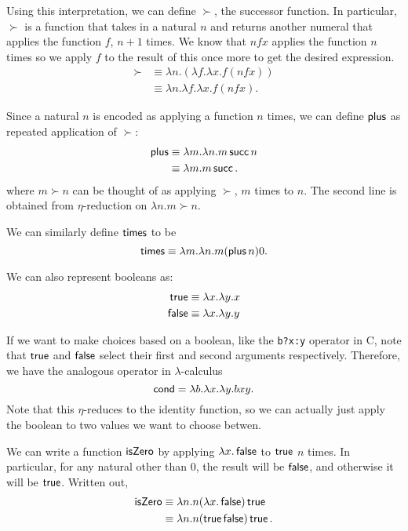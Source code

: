 \documentclass[class=scrartcl]{standalone}
\begin{document}
Using this interpretation, we can define \(\succ\), the successor function.
In particular, \(\succ\) is a function that takes in a natural \(n\)
and returns another numeral that applies the function \(f\), \(n + 1\) times.
We know that \(n f x\) applies the function \(n\) times so
we apply \(f\) to the result of this once more to get the desired expression.
\begin{align*}
  \succ &\equiv \lambda n. (\lambda f. \lambda x. f (n f x)) \\
        &\equiv \lambda n. \lambda f. \lambda x. f (n f x).
\end{align*}

Since a natural \(n\) is encoded as applying a function \(n\) times,
we can define \(\operatorname{\textsf{plus}}\) as repeated application of \(\succ\):
\begin{align*}
  \operatorname{\textsf{plus}} &\equiv \lambda m. \lambda n. m \operatorname{\textsf{succ}} n \\
              &\equiv \lambda m. m \operatorname{\textsf{succ}}.
\end{align*}
where \(m \succ n\) can be thought of as applying \(\succ\),
\(m\) times to \(n\).
The second line is obtained from \(\eta\)-reduction
on \(\lambda n. m \succ n\).

We can similarly define \(\operatorname{\textsf{times}}\) to be
\[
  \operatorname{\textsf{times}} \equiv \lambda m. \lambda n. m (\operatorname{\textsf{plus}} n) 0.
\]


We can also represent booleans as:
\begin{align*}
  \operatorname{\textsf{true}} &\equiv \lambda x. \lambda y. x \\
  \operatorname{\textsf{false}} &\equiv \lambda x. \lambda y. y
\end{align*}

If we want to make choices based on a boolean,
like the \texttt{b?x:y} operator in C,
note that \(\operatorname{\textsf{true}}\) and \(\operatorname{\textsf{false}}\) select
their first and second arguments respectively.
Therefore, we have the analogous operator in \(\lambda\)-calculus
\[
  \operatorname{\textsf{cond}} = \lambda b. \lambda x. \lambda y. b x y.
\]
Note that this \(\eta\)-reduces to the identity function,
so we can actually just apply the boolean
to two values we want to choose betwen.

We can write a function \(\operatorname{\textsf{isZero}}\)
by applying \(\lambda x. \operatorname{\textsf{false}}\) to \(\operatorname{\textsf{true}}\) \(n\) times.
In particular, for any natural other than \(0\),
the result will be \(\operatorname{\textsf{false}}\),
and otherwise it will be \(\operatorname{\textsf{true}}\).
Written out,
\begin{align*}
  \operatorname{\textsf{isZero}} &\equiv \lambda n. n (\lambda x. \operatorname{\textsf{false}}) \operatorname{\textsf{true}} \\
                &\equiv \lambda n. n (\operatorname{\textsf{true}} \operatorname{\textsf{false}}) \operatorname{\textsf{true}}.
\end{align*}
\end{document}
